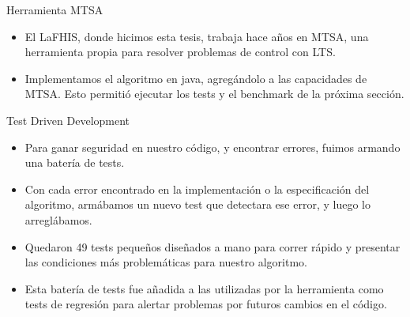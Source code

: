 \begin{frame}{Herramienta MTSA}
    \begin{itemize}
    	\item El LaFHIS, donde hicimos esta tesis, trabaja hace años en MTSA, una herramienta propia para resolver problemas de control con LTS.
    	\item Implementamos el algoritmo en java, agregándolo a las capacidades de MTSA. Esto permitió ejecutar los tests y el benchmark de la próxima sección.
    \end{itemize}
\end{frame}
\begin{frame}{Test Driven Development}
	\begin{itemize}
		\item Para ganar seguridad en nuestro código, y encontrar errores, fuimos armando una batería de tests.
		\item Con cada error encontrado en la implementación o la especificación del algoritmo, armábamos un nuevo test que detectara ese error, y luego lo arreglábamos.
		\item Quedaron 49 tests pequeños diseñados a mano para correr rápido y presentar las condiciones más problemáticas para nuestro algoritmo.
		\item Esta batería de tests fue añadida a las utilizadas por la herramienta como tests de regresión para alertar problemas por futuros cambios en el código.
	\end{itemize}
\end{frame}
